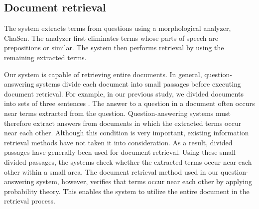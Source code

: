 \subsection{Document retrieval}
\label{sec:document_retrieval}

The system extracts terms from questions using a morphological 
analyzer, ChaSen\cite{chasen}. The analyzer first eliminates terms whose parts of speech are 
prepositions or similar. The system then performs retrieval by using the remaining extracted terms. 

Our system is capable of retrieving entire documents. 
In general, question-answering systems 
divide each document into small passages before executing document 
retrieval. For example, in our 
previous study, we divided documents into sets of three sentences \cite{qa_memo2,murata2000_1_nl_eng}. 
The answer to a question in a document often occurs 
near terms extracted from the question. 
Question-answering systems must therefore extract answers from documents in which 
the extracted terms occur near each other. 
Although this condition 
is very important, existing information retrieval methods have 
not taken it into consideration. As a result, divided passages have generally 
been used for document retrieval. 
Using these small divided passages, 
the systems check whether the extracted terms occur near each other within a small area. 
The document retrieval method used in our question-answering system, however, 
verifies that terms occur near each other by applying probability theory. 
This enables the system to utilize the entire document in the retrieval process. 

